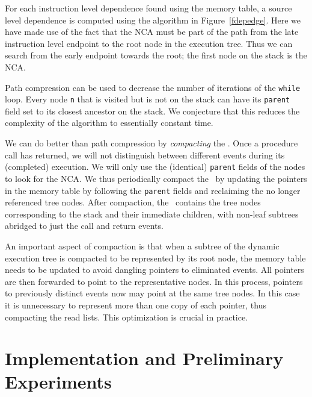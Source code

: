 \documentclass{acm_proc_article-sp}
\begin{document}
For each instruction level dependence found using the memory table,
a source level dependence is computed using the algorithm in 
Figure~\ref{fdepedge}. Here we
have made use of the fact that the NCA must be part of the path from the
late instruction level endpoint to the root node in the execution tree. 
Thus
we can search from the early endpoint towards the root; the first node
on the stack is the NCA.

Path compression can be used to decrease the number of iterations of the 
{\tt while} loop.
Every node {\tt n} that is visited but is not on the stack can have its 
{\tt parent} field set
to its closest ancestor on the stack. We conjecture that this reduces the 
complexity of the algorithm to essentially constant time. 


We can do better than path compression by {\em compacting} the \tracepile. 
Once a procedure call has returned, we will not distinguish between 
different events during its (completed) execution. We will only use the
(identical) {\tt parent} fields of the nodes to look for the NCA. We 
thus periodically compact the \tracepile\ by updating the pointers in 
the memory table by following the {\tt parent} fields and reclaiming the no longer
referenced tree nodes. After compaction, the \tracepile\ contains the
tree nodes corresponding to the stack and their immediate children,
with non-leaf subtrees abridged to just the call and return events.




An important aspect of compaction is that when a subtree of the dynamic
execution tree is compacted to be represented by its root node, the memory table
needs to be updated to avoid dangling pointers to eliminated events. All
pointers are then forwarded to point to the representative nodes. In this
process, pointers to previously distinct events now may point at the same 
tree nodes. In this case it is unnecessary to represent more than one 
copy of each pointer, thus compacting the read lists. This optimization is 
crucial in practice.




\section{Implementation and Preliminary Experiments}
\end{document}
